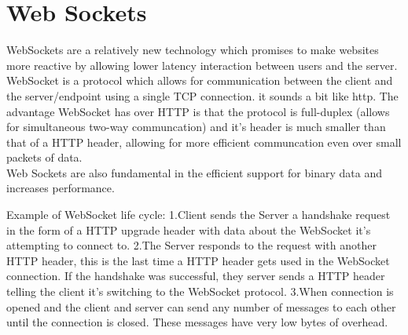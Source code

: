 \section{Web Sockets}
\label{section:websockets}

WebSockets\citep{Ontology:Matching} are a relatively new technology which promises to make websites more reactive by allowing lower latency
interaction between users and the server.\\

WebSocket is a protocol which allows for communication between the client and the server/endpoint using a single TCP
connection. it sounds a bit like http. The advantage WebSocket has over HTTP is that the protocol is full-duplex
(allows for simultaneous two-way communcation) and it’s header is much smaller than that of a HTTP header, allowing for
more efficient communcation even over small packets of data.\\

Web Sockets are also fundamental in the efficient support for binary data and increases performance.

Example of WebSocket life cycle:
1.Client sends the Server a handshake request in the form of a HTTP upgrade header with data about the WebSocket
it’s attempting to connect to.
2.The Server responds to the request with another HTTP header, this is the last time a HTTP header gets used in the
WebSocket connection. If the handshake was successful, they server sends a HTTP header telling the client it’s
switching to the WebSocket protocol.
3.When connection is opened and the client and server can send any number of messages to each other
until the connection is closed. These messages have very low bytes of overhead.
